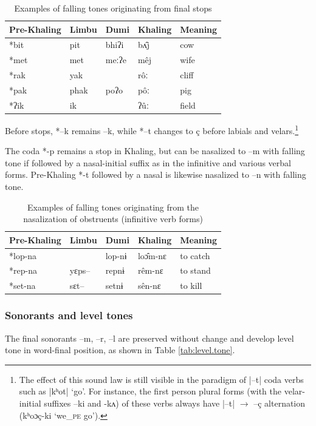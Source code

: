 \documentclass[oldfontcommands,oneside,a4paper,11pt]{article}
\newcommand{\ipa}[1]{{\phon \mbox{#1}}} %
\begin{document}
\begin{table}[h]
\caption{Examples of falling tones originating from final stops} \centering \label{tab:fall.stop}
\begin{tabular}{lllll}
\toprule
Pre-Khaling	&Limbu	&Dumi	&Khaling	&Meaning\\
\midrule
\ipa{*bit}	& \ipa{pit} &	\ipa{bhiʔi}	 & \ipa{bʌ̂j} &	cow\\
\ipa{*met} &	\ipa{met}	& \ipa{meːʔe} &	\ipa{mêj} &	wife\\
\ipa{*rak}	& \ipa{yak}	& &	\ipa{rôː}	& cliff \\
\ipa{*pak} &	\ipa{phak}	& \ipa{poʔo}	& \ipa{pôː}	& pig\\
\ipa{*ʔik}	& \ipa{ik}	& &	\ipa{ʔûː}	& field\\
\bottomrule
\end{tabular}
\end{table}
 
Before stops, \ipa{*--k} remains \ipa{--k}, while \ipa{*--t} changes to \ipa{ç} before labials and velars.\footnote{The effect of this sound law  is still visible in the paradigm of  |--t| coda verbs such as |\ipa{kʰot}| `go'. For instance, the first person plural forms (with the velar-initial suffixes \ipa{--ki} and \ipa{-kʌ}) of these verbs always have |--t| $\rightarrow$ \ipa{--ç} alternation  (\ipa{kʰoɔç-ki} `we_{\textsc{pe}} go').}

The coda \ipa{*-p} remains a stop in Khaling, but can be nasalized to \ipa{–m} with falling tone if followed by a nasal-initial suffix as in the infinitive and various verbal forms. Pre-Khaling \ipa{*-t} followed by a nasal is likewise nasalized to \ipa{--n} with falling tone.
\begin{table}[h]
\caption{Examples of falling tones originating from the nasalization of obstruents (infinitive verb forms)} \centering
\begin{tabular}{lllll}
\toprule
Pre-Khaling	&Limbu	&Dumi	&Khaling	&Meaning\\
\midrule
\ipa{*lop-na}	& & \ipa{lop-nɨ}	 & \ipa{loɔ̂m-nɛ}	&to catch\\
\ipa{*rep-na}	&\ipa{yɛps--} & \ipa{repnɨ	}& \ipa{rêm-nɛ}	&to stand\\
\ipa{*set-na}	&  \ipa{sɛt--}& \ipa{setnɨ	}& \ipa{sên-nɛ}	&to kill\\
\bottomrule
\end{tabular}
\end{table}
\subsubsection{Sonorants and level tones}
The final sonorants \ipa{--m}, \ipa{--r}, \ipa{--l} are preserved without change and develop level tone in word-final position, as shown in Table \ref{tab:level.tone}.
\end{document}

